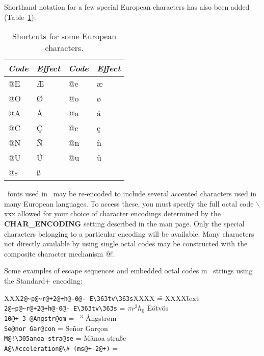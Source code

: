 Shorthand notation for a few special European characters has also been
added (Table~\ref{tbl:scand}):

\begin{table}[H]
\centering
\begin{tabular}{|l|l||l|l|} \hline
\emph{Code} & \emph{Effect}  & \emph{Code} & \emph{Effect} \\ \hline
@E &  \AE   & @e &  \ae   \\ \hline
@O &  \O    & @o &  \o    \\ \hline
@A &  \AA   & @a &  \aa   \\ \hline
@C &  \c{C} & @c &  \c{c} \\ \hline
@N &  \~{N} & @n &  \~{n} \\ \hline
@U &  \"{U} & @u &  \"{u} \\ \hline
@s &  \ss   &    &        \\ \hline
\end{tabular}
\caption{Shortcuts for some European characters.}
\label{tbl:scand}
\end{table}

\PS\ fonts used in \GMT\ may be re-encoded to include
several accented characters used in many European languages.  To
access these, you must specify the full octal code $\backslash$xxx
allowed for your choice of character encodings
determined by the {\bf CHAR\_ENCODING} setting described
in the  man page.  Only the special characters
belonging to a particular encoding will
be available.  Many characters not directly available by
using single octal codes may be constructed with the composite
character mechanism @!.
 
Some examples of escape sequences and embedded octal codes in \GMT\ strings using the
Standard+ encoding: 

\begin{tabbing}
XXX\=\verb|2@~p@~r@+2@+h@-0@- E\363tv\363s|XXXX \== XXXX\=text \kill 
\>\verb|2@~p@~r@+2@+h@-0@- E\363tv\363s| \> = $\pi r^2h_0$ E\"{o}tv\"{o}s \\ 
\>\verb|10@+-3 @Angstr@om|		 \> =	$^{-3}$ \AA ngstr\o m \\ 
\>\verb|Se@nor Gar@con|	 \> = \> Se\~{n}or Gar\c{c}on \\ 
\>\verb|M@!\305anoa stra@se|	 \> = \> M\={a}noa stra\ss e \\ 
\>\verb|A@\#cceleration@\# (ms@+-2@+)|	 \> = \> 
\end{tabbing} 

